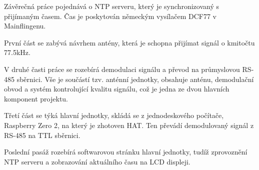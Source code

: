 Závěrečná práce pojednává o NTP serveru, který je synchronizovaný s přijímaným časem. Čas
je poskytován německým vysílačem DCF77 v Mainflingenu.

První část se zabývá návrhem antény, která je schopna přijímat signál o kmitočtu 77.5kHz.

V druhé časti práce se rozebírá demodulaci signálu a převod na průmyslovou RS-485
sběrnici. Vše je součástí tzv. anténní jednotky, obsahuje anténu, demodulační obvod a systém kontrolující kvalitu
signálu, což je jedna ze dvou hlavních komponent projektu.

Třetí část se týká hlavní jednotky, skládá se z jednodeskového počítače, Raspberry Zero 2,
na který je zhotoven HAT. Ten převádí demodulovaný signál z RS-485 na TTL sběrnici.

Poslední pasáž rozebírá softwarovou stránku hlavní jednotky, tudíž zprovoznění NTP
serveru a zobrazování aktuálního času na LCD displeji.

